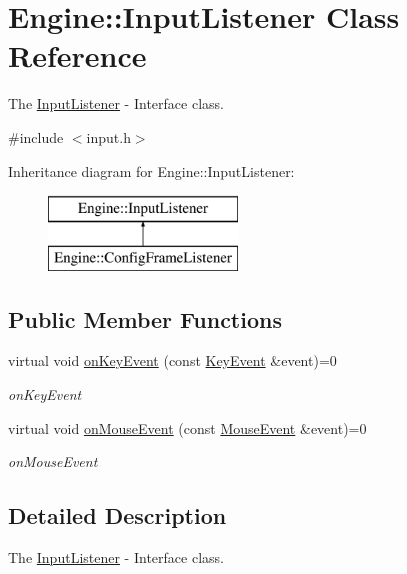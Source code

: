 \hypertarget{classEngine_1_1InputListener}{}\section{Engine\+:\+:Input\+Listener Class Reference}
\label{classEngine_1_1InputListener}


The \hyperlink{classEngine_1_1InputListener}{Input\+Listener} -\/ Interface class.  




{\ttfamily \#include $<$input.\+h$>$}

Inheritance diagram for Engine\+:\+:Input\+Listener\+:\begin{figure}[H]
\begin{center}
\leavevmode
\includegraphics[height=2.000000cm]{classEngine_1_1InputListener}
\end{center}
\end{figure}
\subsection*{Public Member Functions}
\begin{DoxyCompactItemize}
\item 
virtual void \hyperlink{classEngine_1_1InputListener_abcd5e74a03230108bf29f68f74c1a878}{on\+Key\+Event} (const \hyperlink{classEngine_1_1KeyEvent}{Key\+Event} \&event)=0
\begin{DoxyCompactList}\small\item\em on\+Key\+Event \end{DoxyCompactList}\item 
virtual void \hyperlink{classEngine_1_1InputListener_aeee4d9f56950838b71d17ece61656736}{on\+Mouse\+Event} (const \hyperlink{classEngine_1_1MouseEvent}{Mouse\+Event} \&event)=0
\begin{DoxyCompactList}\small\item\em on\+Mouse\+Event \end{DoxyCompactList}\end{DoxyCompactItemize}


\subsection{Detailed Description}
The \hyperlink{classEngine_1_1InputListener}{Input\+Listener} -\/ Interface class. 

